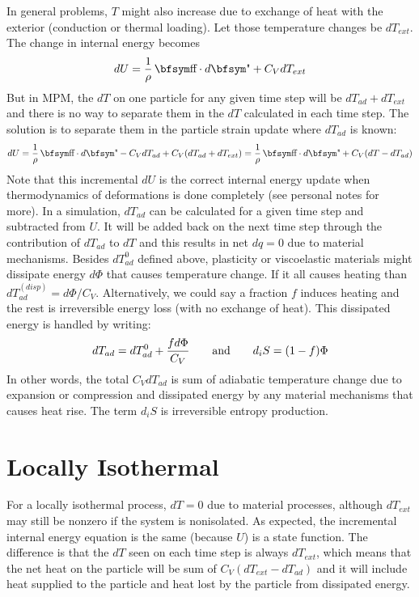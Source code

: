 \documentclass[11pt]{book}
\def\st{{\hbox{\bfsym\char'033}}}
\def\et{{\hbox{\bfsym\char'042}}}
\begin{document}
In general problems, $T$ might also increase due to exchange of heat with the exterior (conduction or thermal loading). Let those temperature changes be $dT_{ext}$. The change in internal energy becomes
\begin{equation}
    dU = {1\over \rho}\thinspace \st\cdot d\et + C_V dT_{ext}
\end{equation}
But in MPM, the $dT$ on one particle for any given time step will be $dT_{ad}+dT_{ext}$ and there is no way to separate them in the $dT$ calculated in each time step. The solution is to separate them in the particle strain update where $dT_{ad}$ is known:
\begin{equation}
    dU = {1\over \rho}\thinspace \st\cdot d\et - C_V dT_{ad} + C_V (dT_{ad}+dT_{ext}) = {1\over \rho}\thinspace \st\cdot d\et + C_V(dT-dT_{ad})
\end{equation}
Note that this incremental $dU$ is the correct internal energy update when thermodynamics of deformations is done completely (see personal notes for more).
In a simulation, $dT_{ad}$ can be calculated for a given time step and subtracted from $U$. It will be added back on the next time step through the contribution of $dT_{ad}$ to $dT$ and this results in net $dq=0$ due to material mechanisms. Besides $dT_{ad}^0$ defined above, plasticity or viscoelastic materials might dissipate energy $d\Phi$ that causes temperature change. If it all causes heating than $dT_{ad}^{(disp)} = d\Phi/C_V$. Alternatively, we could say a fraction $f$ induces heating and the rest is irreversible energy loss (with no exchange of heat). This dissipated energy is handled by writing:
\begin{equation}
    dT_{ad} = dT_{ad}^0 + {fd\Phi\over C_V}   \qquad {\rm and} \qquad d_iS = (1-f)\Phi
\end{equation}
In other words, the total $C_V dT_{ad}$ is sum of adiabatic temperature change due to expansion or compression and dissipated energy by any material mechanisms that causes heat rise. The term $d_iS$ is irreversible entropy production.

\section{Locally Isothermal}

For a locally isothermal process, $dT=0$ due to material processes, although $dT_{ext}$ may still be nonzero if the system is nonisolated. As expected, the incremental internal energy equation is the same (because $U$) is a state function. The difference is that the $dT$ seen on each time step is always $dT_{ext}$, which means that the net heat on the particle will be sum of $C_V(dT_{ext}-dT_{ad})$ and it will include heat supplied to the particle and heat lost by the particle from dissipated energy.
\end{document}
